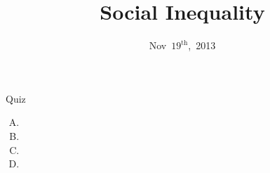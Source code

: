 \documentclass{beamer}
\title{Social Inequality}
\date{Nov~$19^{\text{th}}$,~2013}
\begin{document}
\begin{frame}
\titlepage
\end{frame}

\begin{frame}{Quiz}
\begin{enumerate}[(A)]
\item<1>
\item<1>
\item<1>
\item<1-2>
\end{enumerate}
\end{frame}
\end{document}
